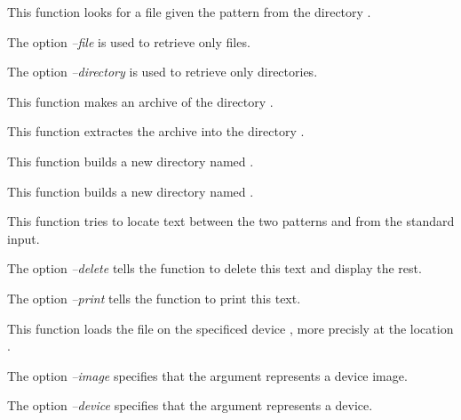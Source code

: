          {
	   This function looks for a file given the pattern
	    from the directory .

	   The option \textit{--file} is used to retrieve only files.

	   The option \textit{--directory} is used to retrieve only
	   directories.
	 }

         {
	   This function makes an archive  of the
	   directory .
	 }

         {
	   This function extractes the archive  into the
	   directory .
	 }

         {
	   This function builds a new directory named
	   .
	 }

         {
	   This function builds a new directory named
	   .
	 }

         {
	   This function tries to locate text between the two patterns
	    and  from the standard input.

	   The option \textit{--delete} tells the function to delete
	   this text and display the rest.

	   The option \textit{--print} tells the function to print
	   this text.
	 }

         {
	   This function loads the file  on the
	   specificed device , more precisly
	   at the location .

	   The option \textit{--image} specifies that the argument
	    represents a device image.

	   The option \textit{--device} specifies that the argument
	    represents a device.
	 }

